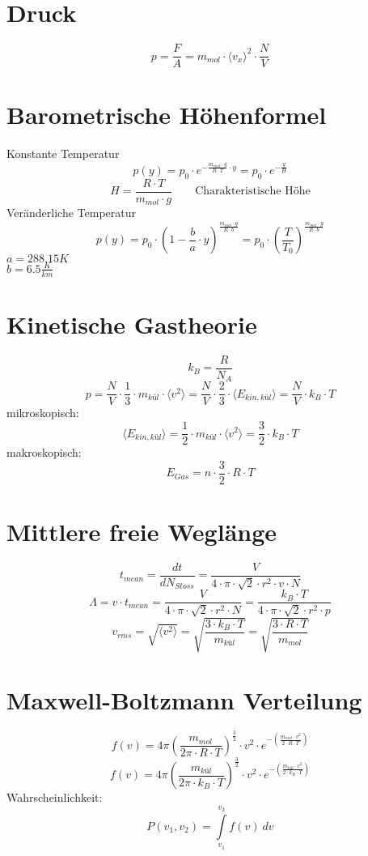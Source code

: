\section{Druck}
\[ \boxed{p = \frac{F}{A} 
= m_{mol} \cdot {\langle v_x\rangle}^2 \cdot \frac{N}{V}} \]

\section{Barometrische Höhenformel}
Konstante Temperatur
\[ \boxed{p(y) 
= p_0 \cdot e^{- \frac{m_{mol} \cdot g}{R \cdot T} \cdot y} 
= p_0 \cdot e^{- \frac{y}{H}}}\]
\[ \boxed{H = \frac{R \cdot T}{m_{mol} \cdot g} 
\qquad \text{Charakteristische Höhe}} \]
Veränderliche Temperatur
\[ \boxed{p(y) = p_0 \cdot \left(1 - \frac{b}{a} \cdot y\right)^
{\frac{m_{mol} \cdot g}{R \cdot b}} 
= p_0 \cdot \left(\frac{T}{T_0}\right)^
{\frac{m_{mol} \cdot g}{R \cdot b}}} \]
$a = 288.15 K$ \\
$b = 6.5 \frac{K}{km}$ \\

\section{Kinetische Gastheorie}
\[ \boxed{k_B = \frac{R}{N_A}} \]
\[ \boxed{p = \frac{N}{V} \cdot \frac{1}{3} \cdot  m_{kül} \cdot \langle v^2\rangle  
= \frac{N}{V} \cdot \frac{2}{3} \cdot \langle E_{kin, kül}\rangle  
= \frac{N}{V} \cdot  k_B \cdot T} \]
mikroskopisch: 
\[ \boxed{\langle E_{kin, kül}\rangle  
= \frac{1}{2} \cdot m_{kül} \cdot  \langle v^2\rangle 
= \frac{3}{2} \cdot k_B \cdot T} \]
makroskopisch: 
\[ \boxed{E_{Gas} = n \cdot \frac{3}{2} \cdot R \cdot T} \]

\section{Mittlere freie Weglänge}
\[ \boxed{t_{mean} = \frac{d t}{d N_{Stoss}} 
= \frac{V}{4 \cdot \pi \cdot \sqrt{2} \cdot r^2 \cdot v \cdot N}} \]
\[ \boxed{\Lambda = v \cdot t_{mean} 
= \frac{V}{4 \cdot \pi \cdot \sqrt{2} \cdot r^2 \cdot N} 
= \frac{k_B \cdot T}{4 \cdot \pi \cdot \sqrt{2} \cdot r^2 \cdot p}} \]
\[ \boxed{v_{rms} = \sqrt{\langle v^2\rangle} 
= \sqrt{\frac{3 \cdot k_B \cdot T}{m_{kül}}} 
= \sqrt{\frac{3 \cdot R \cdot T}{m_{mol}}}} \]

\section{Maxwell-Boltzmann Verteilung}
\[ \boxed{f(v) = 4 \pi \left(\frac{m_{mol}}{2 \pi \cdot R \cdot T}\right)
^{\frac{3}{2}} \cdot v^2 \cdot e^{-\left(\frac{m_{mol} \cdot v^2}
{2 \cdot R \cdot T}\right)}} \]
\[ \boxed{f(v) = 4 \pi \left(\frac{m_{kül}}{2 \pi \cdot k_B \cdot T}\right)
^{\frac{3}{2}} \cdot v^2 \cdot e^{-\left(\frac{m_{kül} \cdot v^2}
{2 \cdot k_B \cdot T}\right)}} \]
Wahrscheinlichkeit:
\[ \boxed{P(v_1, v_2) = \int\limits_{v_1}^{v_2} f(v) ~ dv} \]

